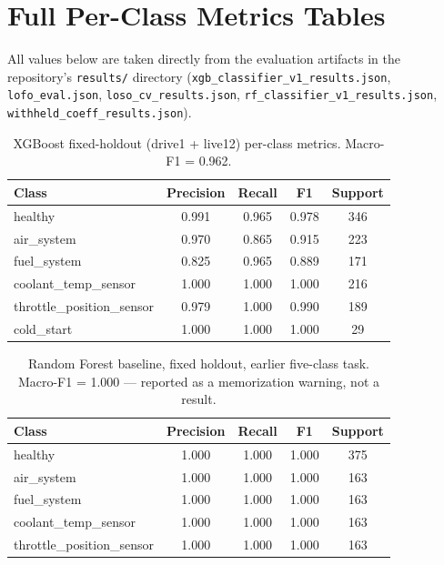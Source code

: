 

\clearpage


\clearpage
\section{Full Per-Class Metrics Tables}
\label{app:metrics}

All values below are taken directly from the evaluation artifacts in the
repository's \texttt{results/} directory
(\texttt{xgb\_classifier\_v1\_results.json}, \texttt{lofo\_eval.json},
\texttt{loso\_cv\_results.json}, \texttt{rf\_classifier\_v1\_results.json},
\texttt{withheld\_coeff\_results.json}).

\begin{table}[H]
  \centering
  \caption{XGBoost fixed-holdout (drive1 + live12) per-class metrics.
    Macro-F1 = 0.962.}
  \label{tab:xgbperclass}
  \begin{tabular}{lcccc}
    \toprule
    Class & Precision & Recall & F1 & Support\\
    \midrule
    healthy                    & 0.991 & 0.965 & 0.978 & 346\\
    air\_system                & 0.970 & 0.865 & 0.915 & 223\\
    fuel\_system               & 0.825 & 0.965 & 0.889 & 171\\
    coolant\_temp\_sensor      & 1.000 & 1.000 & 1.000 & 216\\
    throttle\_position\_sensor & 0.979 & 1.000 & 0.990 & 189\\
    cold\_start                & 1.000 & 1.000 & 1.000 & 29\\
    \bottomrule
  \end{tabular}
\end{table}

\begin{table}[H]
  \centering
  \caption{Random Forest baseline, fixed holdout, earlier five-class task.
    Macro-F1 = 1.000 --- reported as a memorization warning, not a result.}
  \label{tab:rfperclass}
  \begin{tabular}{lcccc}
    \toprule
    Class & Precision & Recall & F1 & Support\\
    \midrule
    healthy                    & 1.000 & 1.000 & 1.000 & 375\\
    air\_system                & 1.000 & 1.000 & 1.000 & 163\\
    fuel\_system               & 1.000 & 1.000 & 1.000 & 163\\
    coolant\_temp\_sensor      & 1.000 & 1.000 & 1.000 & 163\\
    throttle\_position\_sensor & 1.000 & 1.000 & 1.000 & 163\\
    \bottomrule
  \end{tabular}
\end{table}

